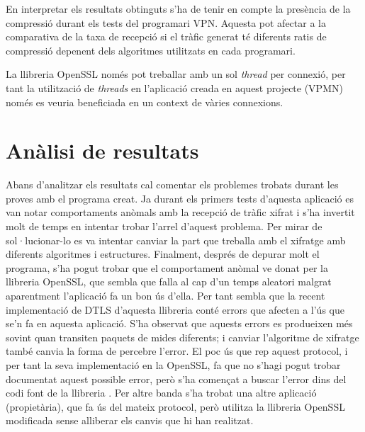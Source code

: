 En interpretar els resultats obtinguts s'ha de tenir en compte la presència de la compressió durant els tests del programari VPN. Aquesta pot afectar a la comparativa de la taxa de recepció si el tràfic generat té diferents ratis de compressió depenent dels algoritmes utilitzats en cada programari.

La llibreria OpenSSL només pot treballar amb un sol \emph{thread} per connexió, per tant la utilització de \emph{threads} en l'aplicació creada en aquest projecte (VPMN) només es veuria beneficiada en un context de vàries connexions.


\section{Anàlisi de resultats}
Abans d'analitzar els resultats cal comentar els problemes trobats durant les proves amb el programa creat. 
Ja durant els primers tests d'aquesta aplicació es van notar comportaments anòmals amb la recepció de tràfic xifrat i s'ha invertit molt de temps en intentar trobar l'arrel d'aquest problema. Per mirar de sol·lucionar-lo es va intentar canviar la part que treballa amb el xifratge amb diferents algoritmes i estructures. Finalment, després de depurar molt el programa, s'ha pogut trobar que el comportament anòmal ve donat per la llibreria OpenSSL, que sembla que falla al cap d'un temps aleatori \cite{dtls-error} malgrat aparentment l'aplicació fa un bon ús d'ella. Per tant sembla que la recent implementació de DTLS d'aquesta llibreria conté errors que afecten a l'ús que se'n fa en aquesta aplicació. S'ha observat que aquests errors es produeixen més sovint quan transiten paquets de mides diferents; i canviar l'algoritme de xifratge també canvia la forma de percebre l'error.
El poc ús que rep aquest protocol, i per tant la seva implementació en la OpenSSL, fa que no s'hagi pogut trobar documentat aquest possible error, però s'ha començat a buscar l'error dins del codi font de la llibreria \cite{dtls-error}. Per altre banda s'ha trobat una altre aplicació (propietària), que fa ús del mateix protocol, però utilitza la llibreria OpenSSL modificada \cite{dtls-cisco} sense alliberar els canvis que hi han realitzat.

